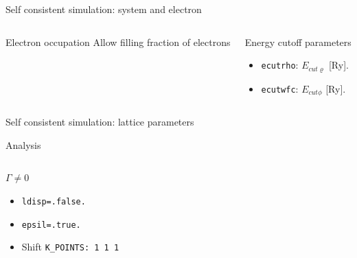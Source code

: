 \documentclass[dvipsnames]{beamer}
\begin{document}
		\begin{frame}{Self consistent simulation: system and electron}	
		\begin{columns}[T] %
			\begin{column}{.50\textwidth}
			
			\begin{block}{Electron occupation}
			Allow filling fraction of electrons 
			\end{block}
			\end{column}
			\hfill
			\begin{column}{.50\textwidth}
			
			\begin{block}{Energy cutoff parameters}
			\begin{itemize}
			\item \texttt{ecutrho}: $E_{cut\varrho}$ [\si{Ry}].
			\item \texttt{ecutwfc}: $E_{cut\phi}$ [\si{Ry}].
			\end{itemize}
			\end{block}
			\end{column}
		\end{columns}
		\end{frame}
		
		\begin{frame}{Self consistent simulation: lattice parameters}
		
		\end{frame}
		
		\begin{frame}{Analysis}	
		
		\begin{columns}[T] %
			\begin{column}{.50\textwidth}
			\texttt{\color{red}{mos2-bulk.phX.in}}
			
			\begin{block}{$\Gamma \neq 0$}
			\begin{itemize}
			\item \texttt{ldisp=.false.}
			\item \texttt{epsil=.true.}
			\item Shift \texttt{K\_POINTS: 1 1 1}
			\end{itemize}
			\end{block}
			\end{column}
			\hfill
			\begin{column}{.50\textwidth}
			\texttt{\color{red}{matdyn.in}}
			
			\texttt{\color{red}{q2r.in}}
			
			\end{column}
		\end{columns}
		\end{frame}
	
\end{document}
